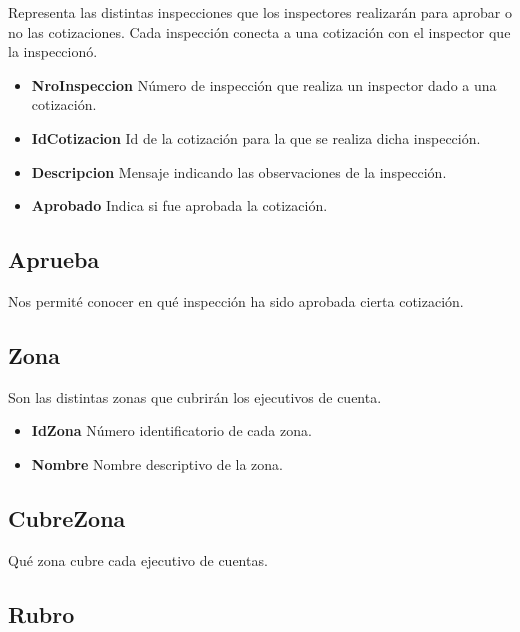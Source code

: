 \documentclass[a4paper,11pt]{article}
\begin{document}
Representa las distintas inspecciones que los inspectores realizarán para aprobar o no las cotizaciones.
Cada inspección conecta a una cotización con el inspector que la inspeccionó.

\begin{itemize}
   
  \item \textbf{NroInspeccion} Número de inspección que realiza un inspector dado a una cotización.
  
  \item \textbf{IdCotizacion} Id de la cotización para la que se realiza dicha inspección.
    
  \item \textbf{Descripcion} Mensaje indicando las observaciones de la inspección.

  \item \textbf{Aprobado} Indica si fue aprobada la cotización.
    
\end{itemize}

\subsection{Aprueba}

Nos permité conocer en qué inspección ha sido aprobada cierta cotización.

\subsection{Zona}

Son las distintas zonas que cubrirán los ejecutivos de cuenta.

\begin{itemize}
   
  \item \textbf{IdZona} Número identificatorio de cada zona.
  
  \item \textbf{Nombre} Nombre descriptivo de la zona.
  
\end{itemize}

\subsection{CubreZona}

Qué zona cubre cada ejecutivo de cuentas.

\subsection{Rubro}
\end{document}
